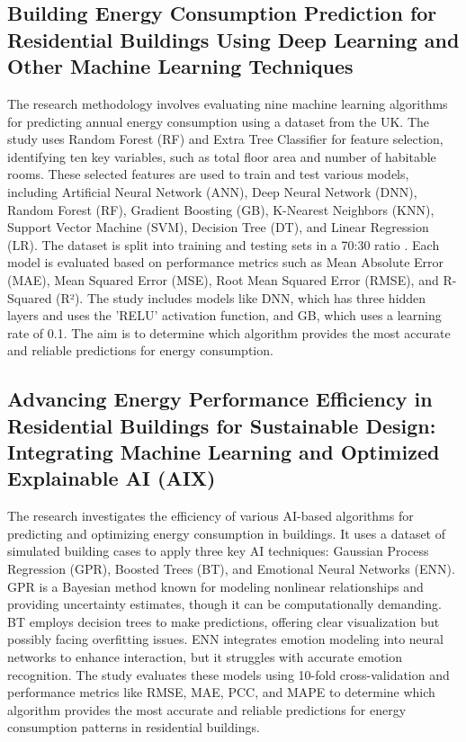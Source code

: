 \documentclass[a4paper, 12pt]{article}
\begin{document}
\subsection{Building Energy Consumption Prediction for Residential Buildings Using Deep Learning and Other Machine Learning Techniques}
\quad The research methodology involves evaluating nine machine learning algorithms for predicting annual energy consumption using a dataset from the UK. The study uses Random Forest (RF) and Extra Tree Classifier for feature selection, identifying ten key variables, such as total floor area and number of habitable rooms. These selected features are used to train and test various models, including Artificial Neural Network (ANN), Deep Neural Network (DNN), Random Forest (RF), Gradient Boosting (GB), K-Nearest Neighbors (KNN), Support Vector Machine (SVM), Decision Tree (DT), and Linear Regression (LR). The dataset is split into training and testing sets in a 70:30 ratio \cite{Olu22}. Each model is evaluated based on performance metrics such as Mean Absolute Error (MAE), Mean Squared Error (MSE), Root Mean Squared Error (RMSE), and R-Squared (R²). The study includes models like DNN, which has three hidden layers and uses the 'RELU' activation function, and GB, which uses a learning rate of 0.1. The aim is to determine which algorithm provides the most accurate and reliable predictions for energy consumption.
\vspace{7pt}

\subsection{Advancing Energy Performance Efficiency in Residential Buildings for Sustainable Design: Integrating Machine Learning and Optimized Explainable AI (AIX)}
\quad The research investigates the efficiency of various AI-based algorithms for predicting and optimizing energy consumption in buildings. It uses a dataset of simulated building cases to apply three key AI techniques: Gaussian Process Regression (GPR), Boosted Trees (BT), and Emotional Neural Networks (ENN). GPR is a Bayesian method known for modeling nonlinear relationships and providing uncertainty estimates, though it can be computationally demanding. BT employs decision trees to make predictions, offering clear visualization but possibly facing overfitting issues. ENN integrates emotion modeling into neural networks to enhance interaction, but it struggles with accurate emotion recognition. The study evaluates these models using 10-fold cross-validation and performance metrics like RMSE, MAE, PCC, and MAPE to determine which algorithm provides the most accurate and reliable predictions for energy consumption patterns in residential buildings.
\vspace{7pt}
\end{document}
